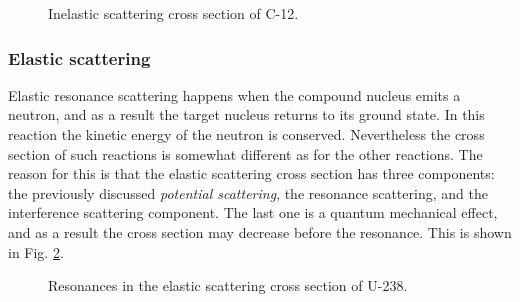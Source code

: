 \begin{figure}[ht!]
\protect {}\protect
\caption{\label{fig:c12inelastic} \footnotesize{Inelastic scattering cross section of C-12.}}
\end{figure}

\subsubsection*{Elastic scattering}

Elastic resonance scattering happens when the compound nucleus emits a neutron, and as a result the target nucleus returns to its ground state. In this reaction the kinetic energy of the neutron is conserved. Nevertheless the cross section of such reactions is somewhat different as for the other reactions. The reason for this is that the elastic scattering cross section has three components: the previously discussed \textit{potential scattering}, the resonance scattering, and the interference scattering component. The last one is a quantum mechanical effect, and as a result the cross section may decrease before the resonance. This is shown in Fig. \ref{fig:u238elastic}.

\begin{figure}[ht!]
\protect {}\protect
\caption{\label{fig:u238elastic} \footnotesize{Resonances in the elastic scattering cross section of U-238.}}
\end{figure}

